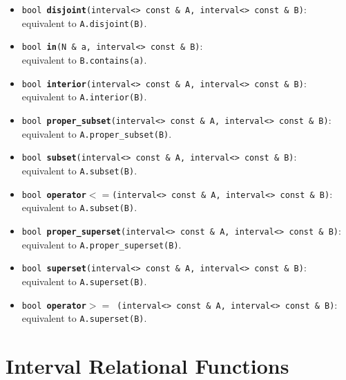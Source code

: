 \documentclass{report}
\begin{document}
\begin{itemize}
		\item
			\texttt{bool {\bf disjoint}(interval<> const \& A, interval<> const \& B)}:\\
				equivalent to \texttt{A.disjoint(B)}.
		\item
			\texttt{bool {\bf in}(N \& a, interval<> const \& B)}:\\
				equivalent to \texttt{B.contains(a)}.
		\item
			\texttt{bool {\bf interior}(interval<> const \& A, interval<> const \& B)}:\\
				equivalent to \texttt{A.interior(B)}.
		\item
			\texttt{bool {\bf proper\_subset}(interval<> const \& A, interval<> const \& B)}:\\
				equivalent to \texttt{A.proper\_subset(B)}.
		\item
			\texttt{bool {\bf subset}(interval<> const \& A, interval<> const \& B)}:\\
				equivalent to \texttt{A.subset(B)}.
		\item
			\texttt{bool {\bf operator$<=$}(interval<> const \& A, interval<> const \& B)}:\\
				equivalent to \texttt{A.subset(B)}.
		\item
			\texttt{bool {\bf proper\_superset}(interval<> const \& A, interval<> const \& B)}:\\
				equivalent to \texttt{A.proper\_superset(B)}.
		\item
			\texttt{bool {\bf superset}(interval<> const \& A, interval<> const \& B)}:\\
				equivalent to \texttt{A.superset(B)}.
		\item
			\texttt{bool {\bf operator$>=$ }(interval<> const \& A, interval<> const \& B)}:\\
				equivalent to \texttt{A.superset(B)}.
\end{itemize}
\section{Interval Relational Functions}	
\end{document}
